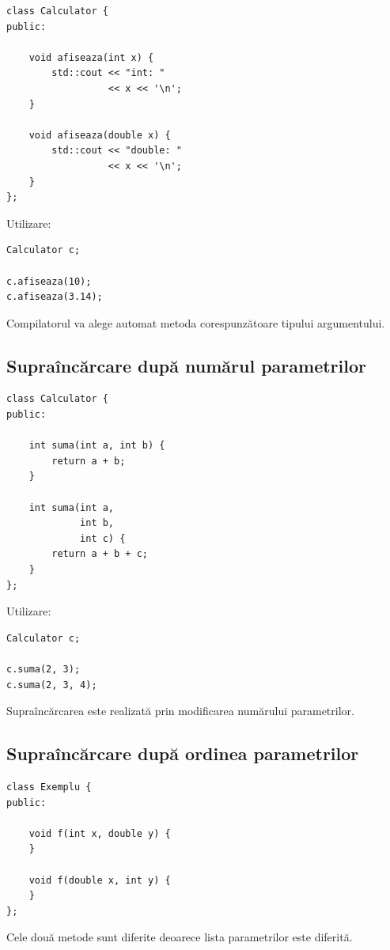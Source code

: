 \documentclass[12pt,a4paper]{article}
\begin{document}
\begin{verbatim}
class Calculator {
public:

    void afiseaza(int x) {
        std::cout << "int: "
                  << x << '\n';
    }

    void afiseaza(double x) {
        std::cout << "double: "
                  << x << '\n';
    }
};
\end{verbatim}

Utilizare:

\begin{verbatim}
Calculator c;

c.afiseaza(10);
c.afiseaza(3.14);
\end{verbatim}

Compilatorul va alege automat metoda corespunzătoare tipului argumentului.

\subsection{Supraîncărcare după numărul parametrilor}

\begin{verbatim}
class Calculator {
public:

    int suma(int a, int b) {
        return a + b;
    }

    int suma(int a,
             int b,
             int c) {
        return a + b + c;
    }
};
\end{verbatim}

Utilizare:

\begin{verbatim}
Calculator c;

c.suma(2, 3);
c.suma(2, 3, 4);
\end{verbatim}

Supraîncărcarea este realizată prin modificarea numărului parametrilor.

\subsection{Supraîncărcare după ordinea parametrilor}

\begin{verbatim}
class Exemplu {
public:

    void f(int x, double y) {
    }

    void f(double x, int y) {
    }
};
\end{verbatim}

Cele două metode sunt diferite deoarece lista parametrilor este diferită.
\end{document}
